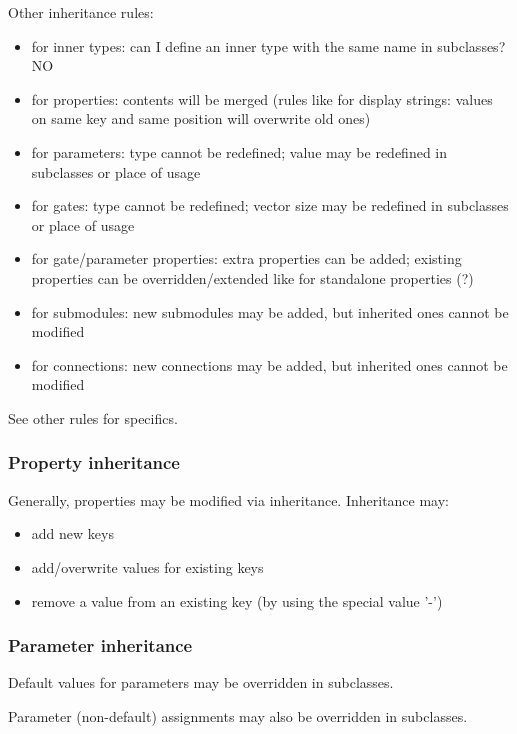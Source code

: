 Other inheritance rules:
\begin{itemize}
  \item  for inner types:
     can I define an inner type with the same name in subclasses? NO
  \item  for properties:
     contents will be merged (rules like for display strings: values on
     same key and same position will overwrite old ones)
  \item for parameters:
     type cannot be redefined;
     value may be redefined in subclasses or place of usage
  \item  for gates:
     type cannot be redefined;
     vector size may be redefined in subclasses or place of usage
  \item  for gate/parameter properties:
     extra properties can be added;
     existing properties can be overridden/extended like for standalone properties (?)
  \item  for submodules:
     new submodules may be added, but inherited ones cannot be modified
  \item  for connections:
     new connections may be added, but inherited ones cannot be modified
\end{itemize}

See other rules for specifics.

\subsubsection{Property inheritance}

Generally, properties may be modified via inheritance. Inheritance may:

\begin{itemize}
    \item add new keys
    \item add/overwrite values for existing keys
    \item remove a value from an existing key (by using the special value '-')
\end{itemize}


\subsubsection{Parameter inheritance}

Default values for parameters may be overridden in subclasses.

Parameter (non-default) assignments may also be overridden in subclasses.

